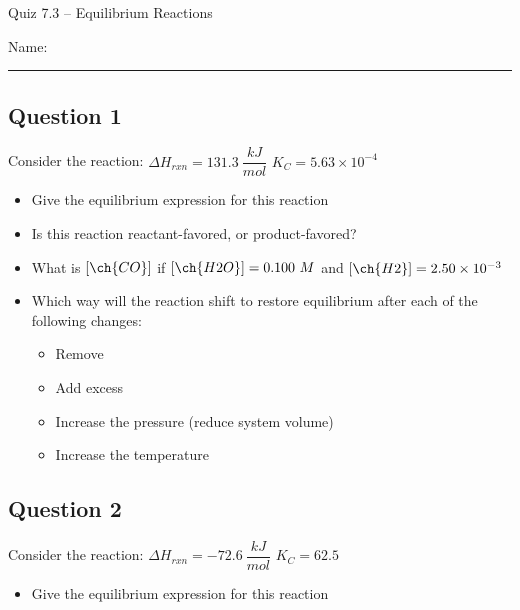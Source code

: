 \documentclass[11pt, letterpaper]{memoir}
\begin{document}
	\begin{center}
		{\large Quiz 7.3 --	Equilibrium Reactions}
	\end{center}
	{\large Name: \rule[-1mm]{4in}{.1pt} 

\subsection*{Question 1}
Consider the reaction:  \hspace{1em} $\Delta H_{rxn} = 131.3~\dfrac{kJ}{mol}$ \hspace{1em} $K_C=5.63\times10^{-4}$

\noindent
\begin{itemize}
	\item Give the equilibrium expression for this reaction
	
	\vspace{2em}
	\item Is this reaction reactant-favored, or product-favored?
	
	\vspace{2em}
	\item What is $\left[\ch{CO}\right]$ if $\left[\ch{H2O}\right] = 0.100~M$ and $\left[\ch{H2}\right]=2.50\times10^{-3}$
	
	\vspace{2em}
	\item Which way will the reaction shift to restore equilibrium after each of the following changes:
	\begin{itemize}
		\item Remove 
		\item Add excess 
		\item Increase the pressure (reduce system volume)
		\item Increase the temperature
	\end{itemize}
\end{itemize}

\subsection*{Question 2}
Consider the reaction:   \hspace{1em} $\Delta H_{rxn} = -72.6~\dfrac{kJ}{mol}$ \hspace{1em} $K_C=62.5$

\noindent
\begin{itemize}
	\item Give the equilibrium expression for this reaction
	

\end{itemize}}
\end{document}
